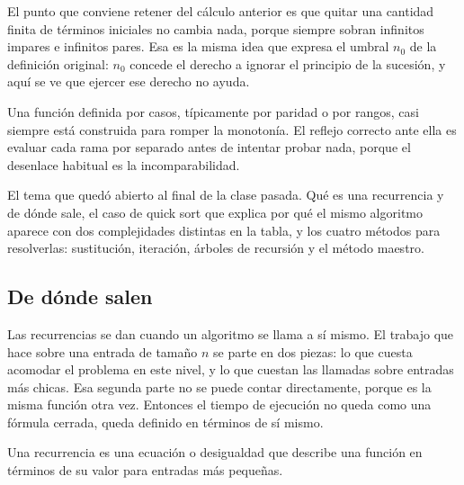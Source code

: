 \documentclass[11pt,letterpaper]{article}
\begin{document}
El punto que conviene retener del cálculo anterior es que quitar una
cantidad finita de términos iniciales no cambia nada, porque siempre
sobran infinitos impares e infinitos pares. Esa es la misma idea que
expresa el umbral $n_0$ de la definición original: $n_0$ concede el
derecho a ignorar el principio de la sucesión, y aquí se ve que
ejercer ese derecho no ayuda.

\begin{idea}[title={Señal de alarma}]
    Una función definida por casos, típicamente por paridad o por
    rangos, casi siempre está construida para romper la monotonía. El
    reflejo correcto ante ella es evaluar cada rama por separado antes
    de intentar probar nada, porque el desenlace habitual es la
    incomparabilidad.
\end{idea}

\newpage



\begin{quick_sum}
  El tema que quedó abierto al final de la clase pasada. Qué es una
  recurrencia y de dónde sale, el caso de quick sort que explica por
  qué el mismo algoritmo aparece con dos complejidades distintas en la
  tabla, y los cuatro métodos para resolverlas: sustitución,
  iteración, árboles de recursión y el método maestro.
\end{quick_sum}

\subsection*{De dónde salen}

Las recurrencias se dan cuando un algoritmo se llama a sí mismo. El
trabajo que hace sobre una entrada de tamaño $n$ se parte en dos
piezas: lo que cuesta acomodar el problema en este nivel, y lo que
cuestan las llamadas sobre entradas más chicas. Esa segunda parte no
se puede contar directamente, porque es la misma función otra vez.
Entonces el tiempo de ejecución no queda como una fórmula cerrada,
queda definido en términos de sí mismo.

\begin{definicion}
  Una recurrencia es una ecuación o desigualdad que describe una
  función en términos de su valor para entradas más pequeñas.
\end{definicion}
\end{document}
